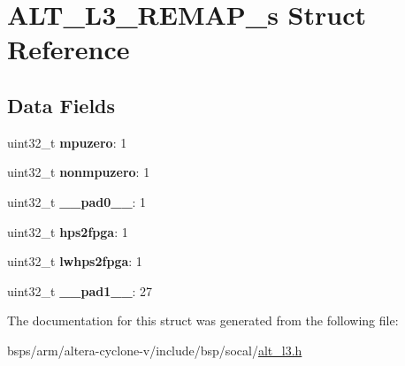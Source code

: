 \hypertarget{structALT__L3__REMAP__s}{}\section{A\+L\+T\+\_\+\+L3\+\_\+\+R\+E\+M\+A\+P\+\_\+s Struct Reference}
\label{structALT__L3__REMAP__s}
\subsection*{Data Fields}
\begin{DoxyCompactItemize}
\item 
\mbox{\label{structALT__L3__REMAP__s_a6014a48929edac888c1e0254ec13fc42}} 
uint32\+\_\+t {\bfseries mpuzero}\+: 1
\item 
\mbox{\label{structALT__L3__REMAP__s_adddc229ee75d6737fdbe3cdb830fbea8}} 
uint32\+\_\+t {\bfseries nonmpuzero}\+: 1
\item 
\mbox{\label{structALT__L3__REMAP__s_ac8ed11564c5b150885240416fa4944da}} 
uint32\+\_\+t {\bfseries \+\_\+\+\_\+pad0\+\_\+\+\_\+}\+: 1
\item 
\mbox{\label{structALT__L3__REMAP__s_a65176b9ff91885cb306fe93b22ec4fcf}} 
uint32\+\_\+t {\bfseries hps2fpga}\+: 1
\item 
\mbox{\label{structALT__L3__REMAP__s_afe93acfa497eb9a3b80945b7e81a9d81}} 
uint32\+\_\+t {\bfseries lwhps2fpga}\+: 1
\item 
\mbox{\label{structALT__L3__REMAP__s_aec89afcb40fa0a2f98d61c34d5fce201}} 
uint32\+\_\+t {\bfseries \+\_\+\+\_\+pad1\+\_\+\+\_\+}\+: 27
\end{DoxyCompactItemize}


The documentation for this struct was generated from the following file\+:\begin{DoxyCompactItemize}
\item 
bsps/arm/altera-\/cyclone-\/v/include/bsp/socal/\mbox{\hyperlink{alt__l3_8h}{alt\+\_\+l3.\+h}}\end{DoxyCompactItemize}
